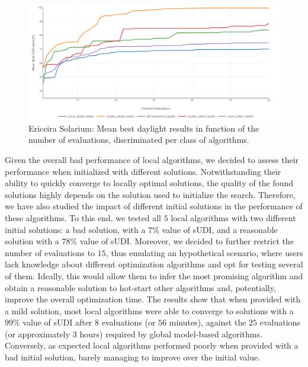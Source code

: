 \begin{figure}[]
	\centering
	\includegraphics[width=2\columnwidth]{../report/Images/Evaluation/Ericeira_results_ph1_per_class.PNG}
	\caption{Ericeira Solarium: Mean best daylight results in function of the number of evaluations, discriminated per class of algorithms.}
	\label{fig:phase1results}
\end{figure}

Given the overall bad performance of local algorithms, we decided to assess their performance when initialized with different solutions. Notwithstanding their ability to quickly converge to locally optimal solutions, the quality of the found solutions highly depends on the solution used to initialize the search. Therefore, we have also studied the impact of different initial solutions in the performance of these algorithms. To this end, we tested all $5$ local algorithms with two different initial solutions: a bad solution, with a $7\%$ value of \ac{sUDI}, and a reasonable solution with a $78\%$ value of \ac{sUDI}. Moreover, we decided to further restrict the number of evaluations to $15$, thus emulating an hypothetical scenario, where users lack knowledge about different optimization algorithms and opt for testing several of them. Ideally, this would allow them to infer the most promising algorithm and obtain a reasonable solution to hot-start other algorithms and, potentially, improve the overall optimization time. The results show that when provided with a mild solution, most local algorithms were able to converge to solutions with a $99\%$ value of \ac{sUDI} after $8$ evaluations (or $56$ minutes), against the $25$ evaluations (or approximately $3$ hours) required by global model-based algorithms. Conversely, as expected local algorithms performed poorly when provided with a bad initial solution, barely managing to improve over the initial value.

